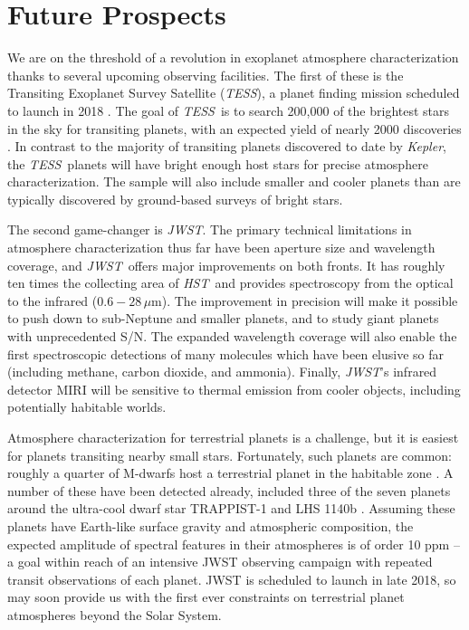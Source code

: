 \documentclass[graybox,natbib,nosecnum]{svmult}
\newcommand{\project}[1]{\textsl{#1}}
\newcommand{\JWST}{\project{JWST}}
\newcommand{\HST}{\project{HST}}
\newcommand{\TESS}{\project{TESS}}
\newcommand{\Kepler}{\project{Kepler}}
\begin{document}
\section{Future Prospects}
We are on the threshold of a revolution in exoplanet atmosphere characterization thanks to several upcoming observing facilities.  The first of these is the Transiting Exoplanet Survey Satellite (\TESS), a planet finding mission scheduled to launch in 2018 \citep{ricker14}.  The goal of \TESS\ is to search 200,000 of the brightest stars in the sky for transiting planets, with an expected yield of nearly 2000 discoveries \citep{sullivan15}. In contrast to the majority of transiting planets discovered to date by \Kepler, the \TESS\ planets will have bright enough host stars for precise atmosphere characterization. The sample will also include smaller and cooler planets than are typically discovered by ground-based surveys of bright stars. 

The second game-changer is \JWST. The primary technical limitations in atmosphere characterization thus far have been aperture size and wavelength coverage, and \JWST\ offers major improvements on both fronts. It has roughly ten times the collecting area of \HST\, and provides spectroscopy from the optical to the infrared ($0.6 - 28\,\mu$m). The improvement in precision will make it possible to push down to sub-Neptune and smaller planets, and to study giant planets with unprecedented S/N. The expanded wavelength coverage will also enable the first spectroscopic detections of many molecules which have been elusive so far (including methane, carbon dioxide, and ammonia). Finally, \JWST's infrared detector MIRI will be sensitive to thermal emission from cooler objects, including potentially habitable worlds.

Atmosphere characterization for terrestrial planets is a challenge, but it is easiest for planets transiting nearby small stars.  Fortunately, such planets are common: roughly a quarter of M-dwarfs host a terrestrial planet in the habitable zone \citep{dressing15}. A number of these have been detected already, included three of the seven planets around the ultra-cool dwarf star TRAPPIST-1 and LHS 1140b \citep{gillon17, dittmann17}. Assuming these planets have Earth-like surface gravity and atmospheric composition, the expected amplitude of spectral features in their atmospheres is of order 10 ppm -- a goal within reach of an intensive JWST observing campaign with repeated transit observations of each planet.  JWST is scheduled to launch in late 2018, so may soon provide us with the first ever constraints on terrestrial planet atmospheres beyond the Solar System. 
\end{document}
